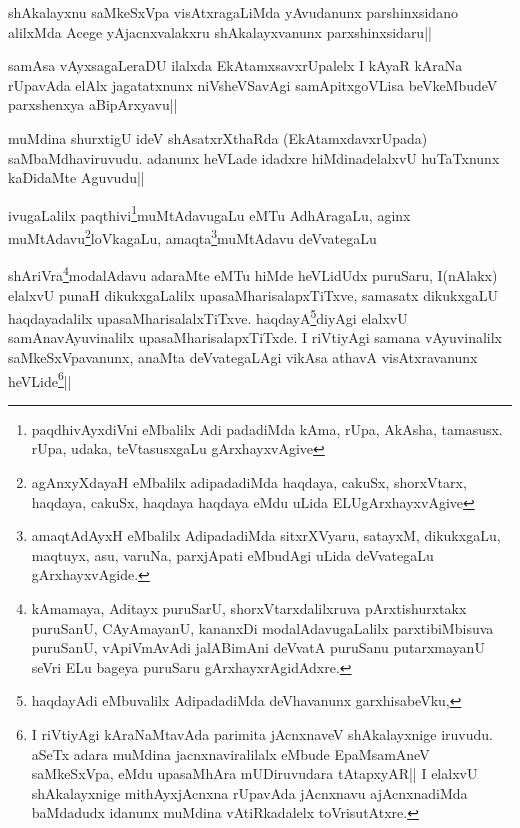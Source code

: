 \begin{artha}
shAkalayxnu saMkeSxVpa visAtxragaLiMda yAvudanunx parshinxsidano alilxMda Acege yAjacnxvalakxru shAkalayxvanunx parxshinxsidaru||
\end{artha}


\begin{artha}
samAsa vAyxsagaLeraDU ilalxda EkAtamxsavxrUpalelx I kAyaR kAraNa rUpavAda elAlx jagatatxnunx niVsheVSavAgi samApitxgoVLisa beVkeMbudeV parxshenxya aBipArxyavu||
\end{artha}

\begin{artha}
muMdina shurxtigU ideV shAsatxrXthaRda (EkAtamxdavxrUpada) saMbaMdhaviruvudu. adanunx heVLade idadxre hiMdinadelalxvU huTaTxnunx kaDidaMte Aguvudu||
\end{artha}


\begin{artha}
ivugaLalilx paqthivi\footnote[1]{paqdhivAyxdiVni eMbalilx Adi padadiMda kAma, rUpa, AkAsha, tamasusx. rUpa, udaka, teVtasusxgaLu gArxhayxvAgive}muMtAdavugaLu eMTu AdhAragaLu, aginx muMtAdavu\footnote[2]{agAnxyXdayaH eMbalilx adipadadiMda haqdaya, cakuSx, shorxVtarx, haqdaya, cakuSx, haqdaya haqdaya eMdu uLida ELUgArxhayxvAgive}loVkagaLu, amaqta\footnote[3]{amaqtAdAyxH eMbalilx AdipadadiMda sitxrXVyaru, satayxM, dikukxgaLu, maqtuyx, asu, varuNa, parxjApati eMbudAgi uLida deVvategaLu gArxhayxvAgide.}muMtAdavu deVvategaLu 
\end{artha}

\begin{artha}
shAriVra\footnote[4]{kAmamaya, Aditayx puruSarU, shorxVtarxdalilxruva pArxtishurxtakx puruSanU, CAyAmayanU, kananxDi modalAdavugaLalilx parxtibiMbisuva puruSanU, vApiVmAvAdi jalABimAni deVvatA puruSanu putarxmayanU seVri ELu bageya puruSaru gArxhayxrAgidAdxre.}modalAdavu adaraMte eMTu hiMde heVLidUdx puruSaru, I(nAlakx) elalxvU punaH dikukxgaLalilx upasaMharisalapxTiTxve, samasatx dikukxgaLU haqdayadalilx upasaMharisalalxTiTxve. haqdayA\footnote[5]{haqdayAdi eMbuvalilx AdipadadiMda deVhavanunx garxhisabeVku,}diyAgi elalxvU samAnavAyuvinalilx upasaMharisalapxTiTxde. I riVtiyAgi samana vAyuvinalilx saMkeSxVpavanunx, anaMta deVvategaLAgi vikAsa athavA visAtxravanunx heVLide\footnote[6]{I riVtiyAgi kAraNaMtavAda parimita jAcnxnaveV shAkalayxnige iruvudu. aSeTx adara muMdina jacnxnaviralilalx eMbude EpaMsamAneV saMkeSxVpa, eMdu upasaMhAra mUDiruvudara tAtapxyAR|| I elalxvU shAkalayxnige mithAyxjAcnxna rUpavAda jAcnxnavu ajAcnxnadiMda baMdadudx idanunx muMdina vAtiRkadalelx toVrisutAtxre.}||
\end{artha}

